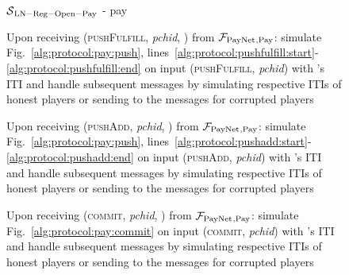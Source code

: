 \begin{figure}[H]
\begin{simulatorbox}{$\mathcal{S}{}_{\mathrm{LN - Reg - Open - Pay}}$ - pay}
\begin{algorithmic}[1]
      \State Upon receiving (\textsc{pushFulfill}, \textit{pchid}, \alice) from
      $\mathcal{F}_{\mathrm{PayNet}}{}_{\mathrm{, Pay}}$:
      \Indent
        \State simulate Fig.~\ref{alg:protocol:pay:push},
        lines~\ref{alg:protocol:pushfulfill:start}-\ref{alg:protocol:pushfulfill:end}
        on input (\textsc{pushFulfill}, \textit{pchid}) with \alice's ITI and
        handle subsequent messages by simulating respective ITIs of honest
        players or sending to \adversary{} the messages for corrupted players
      \EndIndent
      \Statex

      \State Upon receiving (\textsc{pushAdd}, \textit{pchid}, \alice) from
      $\mathcal{F}_{\mathrm{PayNet}}{}_{\mathrm{, Pay}}$:
      \Indent
        \State simulate Fig.~\ref{alg:protocol:pay:push},
        lines~\ref{alg:protocol:pushadd:start}-\ref{alg:protocol:pushadd:end} on
        input (\textsc{pushAdd}, \textit{pchid}) with \alice's ITI and handle
        subsequent messages by simulating respective ITIs of honest players or
        sending to \adversary{} the messages for corrupted players
      \EndIndent
      \Statex

      \State Upon receiving (\textsc{commit}, \textit{pchid}, \alice) from
      $\mathcal{F}_{\mathrm{PayNet}}{}_{\mathrm{, Pay}}$:
      \Indent
        \State simulate Fig.~\ref{alg:protocol:pay:commit} on input
        (\textsc{commit}, \textit{pchid}) with \alice's ITI and handle
        subsequent messages by simulating respective ITIs of honest players or
        sending to \adversary{} the messages for corrupted players
      \EndIndent
    \end{algorithmic}
  \end{simulatorbox}
  \caption{}
  \label{alg:sim:pay}
\end{figure}

